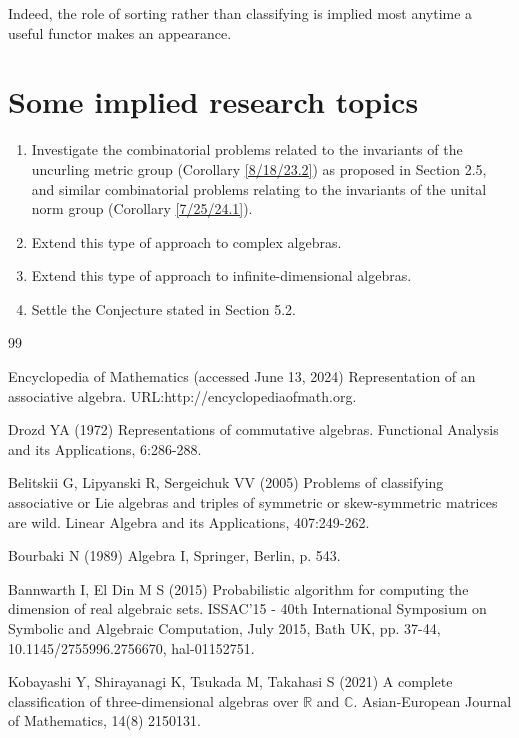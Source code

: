 \documentclass{amsart}
\numberwithin{equation}{section}
\theoremstyle{definition}
\numberwithin{theorem}{section}
\begin{document}
{Indeed, the role of sorting rather than classifying is implied most anytime a useful functor makes an appearance.




\section{Some implied research topics} 
\begin{enumerate} \item Investigate the combinatorial problems related to the invariants of the uncurling metric group (Corollary \ref{8/18/23.2}) as proposed in Section 2.5, and similar combinatorial problems relating to the invariants of the unital norm group (Corollary \ref{7/25/24.1}).  \item Extend this type of approach to complex algebras. \item Extend this type of approach to infinite-dimensional algebras. \item Settle the Conjecture stated in Section 5.2. \end{enumerate}
  
  \vspace{.5cm}
  
   \begin{thebibliography}{99}
   
 Encyclopedia of Mathematics (accessed June 13, 2024) Representation of an associative algebra. URL:http://encyclopediaofmath.org.
   
     Drozd YA (1972) Representations of commutative algebras. Functional Analysis and its Applications, 6:286-288.
          
        Belitskii G, Lipyanski R, Sergeichuk VV (2005) Problems of classifying associative or Lie algebras and triples of symmetric or skew-symmetric matrices are wild.  Linear Algebra and its Applications, 407:249-262.
       
               Bourbaki N (1989) Algebra I, Springer, Berlin, p. 543.

               
        Bannwarth I, El Din M S (2015) Probabilistic algorithm for computing the dimension of real algebraic sets.  ISSAC'15 - 40th International Symposium on Symbolic and Algebraic Computation, July 2015, Bath UK, pp. 37-44, 10.1145/2755996.2756670, hal-01152751.
       
               Kobayashi Y, Shirayanagi K, Tsukada M, Takahasi S (2021) A complete classification of three-dimensional algebras over $\mathbb{R}$ and $\mathbb{C}$. Asian-European Journal of Mathematics, 14(8) 2150131.                                        
  

\end{thebibliography}}
\end{document}
